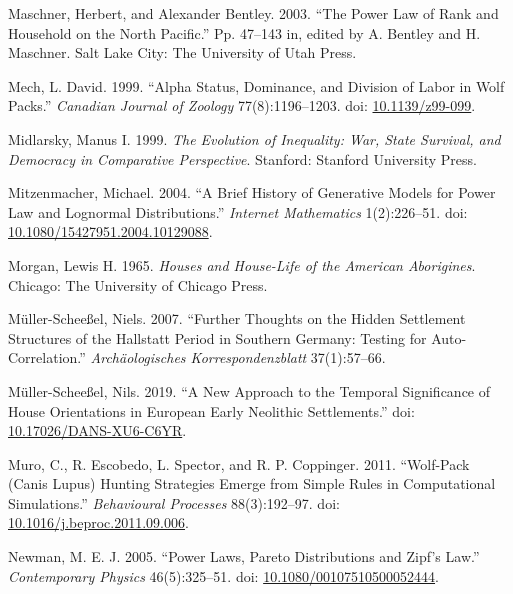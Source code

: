 \documentclass[
  12pt,
]{book}
\newlength{\cslhangindent}
\newlength{\cslentryspacingunit} %
\newenvironment{CSLReferences}[2] %
 {%
  \setlength{\parindent}{0pt}
  \ifodd #1
  \let\oldpar\par
  \def\par{\hangindent=\cslhangindent\oldpar}
  \fi
  \setlength{\parskip}{#2\cslentryspacingunit}
 }%
 {}
\begin{document}
\begin{CSLReferences}{1}{0}
\leavevmode{}%
Maschner, Herbert, and Alexander Bentley. 2003. {``The Power Law of Rank and Household on the North Pacific.''} Pp. 47--143 in, edited by A. Bentley and H. Maschner. Salt Lake City: The University of Utah Press.

\leavevmode{}%
Mech, L. David. 1999. {``Alpha Status, Dominance, and Division of Labor in Wolf Packs.''} \emph{Canadian Journal of Zoology} 77(8):1196--1203. doi: \href{https://doi.org/10.1139/z99-099}{10.1139/z99-099}.

\leavevmode{}%
Midlarsky, Manus I. 1999. \emph{The Evolution of Inequality: War, State Survival, and Democracy in Comparative Perspective}. Stanford: Stanford University Press.

\leavevmode{}%
Mitzenmacher, Michael. 2004. {``A Brief History of Generative Models for Power Law and Lognormal Distributions.''} \emph{Internet Mathematics} 1(2):226--51. doi: \href{https://doi.org/10.1080/15427951.2004.10129088}{10.1080/15427951.2004.10129088}.

\leavevmode{}%
Morgan, Lewis H. 1965. \emph{Houses and House-Life of the American Aborigines}. Chicago: The University of Chicago Press.

\leavevmode{}%
Müller-Scheeßel, Niels. 2007. {``Further Thoughts on the Hidden Settlement Structures of the Hallstatt Period in Southern Germany: Testing for Auto-Correlation.''} \emph{Archäologisches Korrespondenzblatt} 37(1):57--66.

\leavevmode{}%
Müller-Scheeßel, Nils. 2019. {``A New Approach to the Temporal Significance of House Orientations in European Early Neolithic Settlements.''} doi: \href{https://doi.org/10.17026/DANS-XU6-C6YR}{10.17026/DANS-XU6-C6YR}.

\leavevmode{}%
Muro, C., R. Escobedo, L. Spector, and R. P. Coppinger. 2011. {``Wolf-Pack (Canis Lupus) Hunting Strategies Emerge from Simple Rules in Computational Simulations.''} \emph{Behavioural Processes} 88(3):192--97. doi: \href{https://doi.org/10.1016/j.beproc.2011.09.006}{10.1016/j.beproc.2011.09.006}.

\leavevmode{}%
Newman, M. E. J. 2005. {``Power Laws, Pareto Distributions and Zipf's Law.''} \emph{Contemporary Physics} 46(5):325--51. doi: \href{https://doi.org/10.1080/00107510500052444}{10.1080/00107510500052444}.


\end{CSLReferences}
\end{document}
